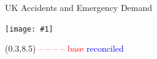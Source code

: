 \documentclass[14pt]{beamer}
\def\fullwidth#1{\vspace*{0.1cm}\par\centerline{\texttt{[image: \#1]}}}
\newcommand{\diag}{{\mbox{diag}}}
\begin{document}



\begin{frame}{\large UK Accidents and Emergency Demand}
\fullwidth{AEexample}

\begin{textblock}{12}(0.3,8.5)
\textcolor{red}{-- -- -- -- base} \hspace*{1cm}
\textcolor{blue}{\raisebox{0.5ex}{\rule{1.5cm}{1pt}} reconciled}
\end{textblock}
\end{frame}
\end{document}
